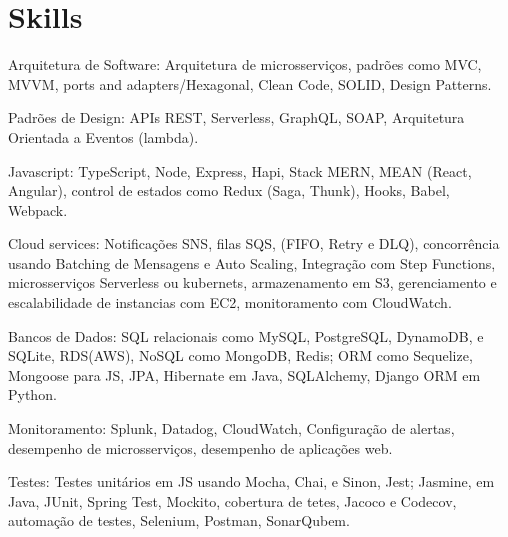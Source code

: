 \documentclass[a4paper,10pt]{article}
\begin{document}
\section*{Skills}
\noindent\makebox[\linewidth]{\rule{\linewidth}{0.1mm}\textcolor{corLarge}{}}

\vspace{1.5mm} \textcolor{corSubSection}{Arquitetura de Software:}
Arquitetura de microsserviços, 
padrões como MVC, MVVM, ports and adapters/Hexagonal,
Clean Code, SOLID, Design Patterns.

\vspace{1.5mm}\textcolor{corSubSection}{Padrões de Design:}
APIs REST, Serverless, GraphQL, SOAP,
Arquitetura Orientada a Eventos (lambda).

\vspace{1.5mm}\textcolor{corSubSection}{Javascript:}
TypeScript, Node, Express, Hapi,
Stack MERN, MEAN (React, Angular),
control de estados como Redux (Saga, Thunk), Hooks,
Babel, Webpack.

\vspace{1.5mm}\textcolor{corSubSection}{Cloud services:}
Notificações SNS,
filas SQS, (FIFO, Retry e DLQ),
concorrência usando Batching de Mensagens e Auto Scaling,
Integração com Step Functions,
microsserviços Serverless ou kubernets,
armazenamento em S3,
gerenciamento e escalabilidade de instancias com EC2,
monitoramento com CloudWatch.

\vspace{1.5mm}\textcolor{corSubSection}{Bancos de Dados:}
SQL relacionais como
MySQL, PostgreSQL, DynamoDB, e SQLite, RDS(AWS),
NoSQL como
MongoDB, Redis;
ORM como
Sequelize, Mongoose para JS,
JPA, Hibernate em Java, SQLAlchemy,
Django ORM em Python.

\vspace{1.5mm}\textcolor{corSubSection}{Monitoramento:}
Splunk, Datadog, CloudWatch,
Configuração de alertas,
desempenho de microsserviços,
desempenho de aplicações web.

\vspace{1.5mm}\textcolor{corSubSection}{Testes:}
Testes unitários em JS usando Mocha,
Chai, e Sinon, Jest; Jasmine,
em Java, JUnit, Spring Test, Mockito,
cobertura de tetes, Jacoco e Codecov,
automação de testes, Selenium, Postman,
SonarQubem.

\end{document}
